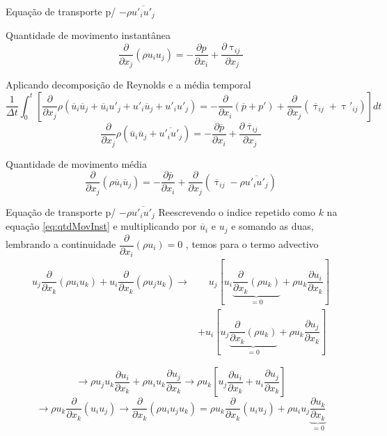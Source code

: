 \documentclass[10pt]{beamer}
\newcommand{\ddx}[2]{\dfrac{\partial #1}{\partial x_{#2}}}
\newcommand{\ddxp}[2]{\dfrac{\partial }{\partial x_{#2}}\left(#1\right)}
\newcommand{\m}[1]{\overline{#1}}
\begin{document}
\begin{frame}{Equação de transporte p/ $ -\rho \m{u'_i u'_j} $}
	\begin{block}{Quantidade de movimento instantânea}
		\begin{equation}\label{eq:qtdMovInst}
		\ddxp{\rho u_i u_j}{j} = - \ddx{p}{i} + \ddx{\uptau_{ij}}{j}
		\end{equation}
	\end{block}

	Aplicando decomposição de Reynolds e a média temporal
	\begin{equation*}
	\dfrac{1}{\Delta t} \int_{0}^{t} \left[ \ddx{ }{j} \rho (\m{u}_i\m{u}_j + \m{u}_i u'_j + u'_i\m{u}_j + u'_i u'_j ) = -\ddxp{\m{p} + p'}{i} + \ddxp{\m{\uptau}_{ij} + \uptau'_{ij}}{j} \right] dt
	\end{equation*}
	\begin{equation*}
	\ddx{ }{j} \rho (\m{u}_i\m{u}_j + \m{u'_i u'_j}) = - \ddx{\m{p}}{i} + \ddx{\m{\uptau}_{ij}}{j}
	\end{equation*}

	\begin{block}{Quantidade de movimento média}
	\begin{equation}\label{eq:qtdMovMean}
	\ddxp{\rho \m{u}_i\m{u}_j}{j} = - \ddx{\m{p}}{i} + \ddxp{\m{\uptau}_{ij} - \rho \m{u'_i u'_j}}{j}
	\end{equation}
	\end{block}
	
\end{frame}


\begin{frame}{Equação de transporte p/ $ -\rho \m{u'_i u'_j} $}
	Reescrevendo o indice repetido como $k$ na equação \ref{eq:qtdMovInst} e multiplicando por $ \m{u}_i $ e $ u_j $ e somando as duas, lembrando a continuidade $ \ddxp{\rho u_i}{i} = 0 $ , temos para o termo advectivo
	\begin{align*}
	u_j \ddxp{\rho u_i u_k}{k} + u_i \ddxp{\rho u_j u_k}{k} \rightarrow 
	&\;\;\;\; u_j \left[ u_i \underbrace{\ddxp{\rho u_k}{k}}_{=0} + \rho u_k\ddx{u_i}{k}\right] \\
	&+ u_i \left[ u_j \underbrace{\ddxp{\rho u_k}{k}}_{=0} + \rho u_k\ddx{u_j}{k}\right]
	\end{align*}
	
	\begin{equation*}
	\rightarrow \rho u_j u_k \ddx{u_i}{k} + \rho u_i u_k \ddx{u_j}{k} \rightarrow \rho u_k \left[ u_j \ddx{u_i}{k} + u_i \ddx{u_j}{k} \right]
	\end{equation*}
	\begin{equation*}
	\rightarrow \rho u_k \ddxp{u_i u_j}{k} \rightarrow \boxed{\ddxp{\rho u_i u_j u_k}{k}}
	= \rho u_k \ddxp{u_i u_j}{k} + \rho u_i u_j \underbrace{\ddx{u_k}{k}}_{=0}
	\end{equation*}
\end{frame}
\end{document}
